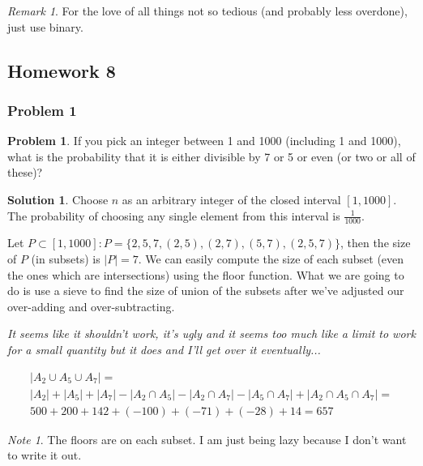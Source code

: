 \documentclass[10pt,a4paper,titlepage,twoside,draft]{article}
\theoremstyle{plain}
\theoremstyle{definition}
\newtheorem*{prob}{Problem}
\newtheorem*{sol}{Solution}
\theoremstyle{remark}
\newtheorem{rem}{Remark}
\newtheorem{nt}{Note}
\begin{document}
\medskip

\begin{rem} 
For the love of all things not so tedious (and probably less overdone), just use binary.
\end{rem}


\subsection{Homework 8}

\subsubsection{Problem 1}

\begin{prob}
If you pick an integer between 1 and 1000 (including 1 and 1000), what is the probability that it is either divisible by 7 or 5 or even (or two or all of these)?
\end{prob}

\medskip

\begin{sol}
Choose $n$ as an arbitrary integer of the closed interval $[1,1000]$. The probability of choosing any single element from this interval is $\frac{1}{1000}$. 

Let $P \subset [1,1000] : P = \{2,5,7,(2,5),(2,7),(5,7),(2,5,7)\}$, then the size of $P$ (in subsets) is $|P| = 7$.
We can easily compute the size of each subset (even the ones which are intersections) using the floor function. What we are going to do is use a sieve to find the size of union of the subsets after we've adjusted our over-adding and over-subtracting. 

\smallskip

\textit{It seems like it shouldn't work, it's ugly and it seems too much like a limit to work for a small quantity but it does and I'll get over it eventually...}

\smallskip

\begin{eqnarray}
|A_{2} \cup A_{5} \cup A_{7}| = \\
|A_{2}| + |A_{5}| + |A_{7}| - |A_{2} \cap A_{5}| - |A_{2} \cap A_{7}| - |A_{5} \cap A_{7}| + |A_{2} \cap A_{5} \cap A_{7}| = \\
500+200+142+(-100)+(-71)+(-28)+14 = 657
\end{eqnarray}
\end{sol}

\smallskip

\begin{nt}
The floors are on each subset. I am just being lazy because I don't want to write it out.
\end{nt}
\end{document}
